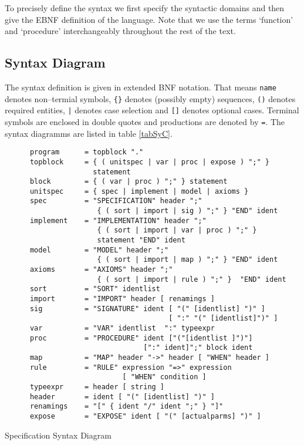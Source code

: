 To precisely define the syntax we first 
specify the syntactic domains and then 
give the EBNF definition of the language.
Note that we use the terms `function' and `procedure'
interchangeably throughout the rest of the 
text.
 
\subsection{Syntax Diagram}

The syntax definition is given in extended 
BNF notation. That means
\verb/name/ denotes non--termial symbols,
\verb/{}/ denotes (possibly empty) sequences,
\verb/()/ denotes required entities,
\verb/|/ denotes case selection and
\verb/[]/ denotes optional cases. 
Terminal symbols are enclosed in double quotes
and productions are denoted by \verb/=/. 
The syntax diagramms are listed in 
table \ref{tabSyC}. %

\begin{table}[thbp]
\small
\begin{center}
\begin{verbatim}
      program      = topblock "."
      topblock     = { ( unitspec | var | proc | expose ) ";" }
                     statement
      block        = { ( var | proc ) ";" } statement
      unitspec     = { spec | implement | model | axioms }
      spec         = "SPECIFICATION" header ";" 
                      { ( sort | import | sig ) ";" } "END" ident
      implement    = "IMPLEMENTATION" header ";" 
                      { ( sort | import | var | proc ) ";" } 
                      statement "END" ident
      model        = "MODEL" header ";" 
                      { ( sort | import | map ) ";" } "END" ident
      axioms       = "AXIOMS" header ";" 
                      { ( sort | import | rule ) ";" }  "END" ident
      sort         = "SORT" identlist   
      import       = "IMPORT" header [ renamings ]   
      sig          = "SIGNATURE" ident [ "(" [identlist] ")" ] 
                                       [ ":" "(" [identlist]")" ] 
      var          = "VAR" identlist  ":" typeexpr  
      proc         = "PROCEDURE" ident ["("[identlist ]")"]
                                 [":" ident]";" block ident 
      map          = "MAP" header "->" header [ "WHEN" header ]
      rule         = "RULE" expression "=>" expression 
                            [ "WHEN" condition ]
      typeexpr     = header [ string ]
      header       = ident [ "(" [identlist] ")" ]
      renamings    = "[" { ident "/" ident ";" } "]"
      expose       = "EXPOSE" ident [ "(" [actualparms] ")" ]
\end{verbatim}
\end{center}
\caption{Specification Syntax Diagram}
\label{tabSyC}
\end{table}

